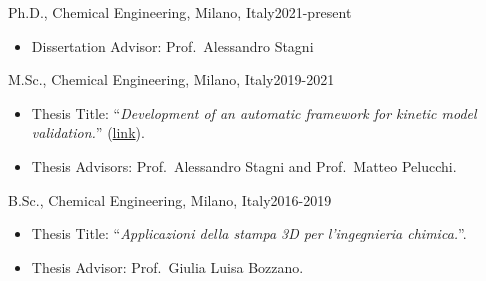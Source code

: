 \begin{position}{Ph.D., Chemical Engineering}{\polimi, Milano, Italy}{2021-present}
   \begin{itemize}
      \item[ ] Dissertation Advisor: Prof.\ Alessandro Stagni
   \end{itemize}
\end{position}

\begin{position}{M.Sc., Chemical Engineering}{\polimi, Milano, Italy}{2019-2021}
   \begin{itemize}
      \item[ ] Thesis Title: ``{\it Development of an automatic framework for kinetic
         model validation.}'' (\href{https://hdl.handle.net/10589/179004}{link}).
      \item[ ] Thesis Advisors: Prof.\ Alessandro Stagni and Prof.\ Matteo Pelucchi.
   \end{itemize}
\end{position}

\begin{position}{B.Sc., Chemical Engineering}{\polimi, Milano, Italy}{2016-2019}
   \begin{itemize}
      \item[ ] Thesis Title: ``{\it Applicazioni della stampa 3D per l'ingegnieria chimica.}''.
      \item[ ] Thesis Advisor: Prof.\ Giulia Luisa Bozzano.
   \end{itemize}
\end{position}

